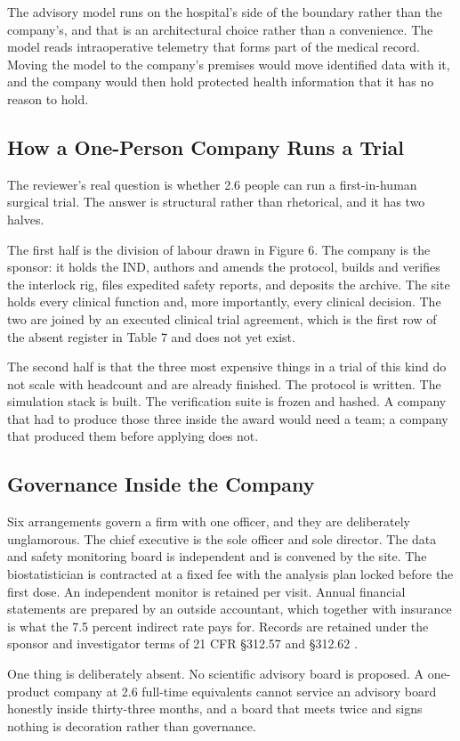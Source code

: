 The advisory model runs on the hospital's side of the boundary rather than the
company's, and that is an architectural choice rather than a convenience. The
model reads intraoperative telemetry that forms part of the medical record.
Moving the model to the company's premises would move identified data with it,
and the company would then hold protected health information that it has no
reason to hold.

\subsection{How a One-Person Company Runs a Trial}

The reviewer's real question is whether 2.6 people can run a first-in-human
surgical trial. The answer is structural rather than rhetorical, and it has two
halves.

The first half is the division of labour drawn in Figure 6. The company is the
sponsor: it holds the IND, authors and amends the protocol, builds and verifies
the interlock rig, files expedited safety reports, and deposits the archive. The
site holds every clinical function and, more importantly, every clinical
decision. The two are joined by an executed clinical trial agreement, which is
the first row of the absent register in Table 7 and does not yet exist.

The second half is that the three most expensive things in a trial of this kind
do not scale with headcount and are already finished. The protocol is written.
The simulation stack is built. The verification suite is frozen and hashed. A
company that had to produce those three inside the award would need a team; a
company that produced them before applying does not.

\subsection{Governance Inside the Company}

Six arrangements govern a firm with one officer, and they are deliberately
unglamorous. The chief executive is the sole officer and sole director. The data
and safety monitoring board is independent and is convened by the site. The
biostatistician is contracted at a fixed fee with the analysis plan locked
before the first dose. An independent monitor is retained per visit. Annual
financial statements are prepared by an outside accountant, which together with
insurance is what the 7.5 percent indirect rate pays for. Records are retained
under the sponsor and investigator terms of 21 CFR \S312.57 and \S312.62
\cite{ecfr2026part312records}.

One thing is deliberately absent. No scientific advisory board is proposed. A
one-product company at 2.6 full-time equivalents cannot service an advisory
board honestly inside thirty-three months, and a board that meets twice and
signs nothing is decoration rather than governance.
